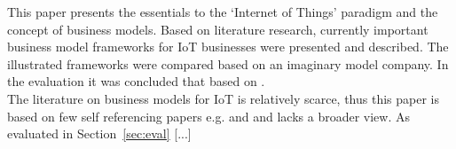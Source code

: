 	This paper presents the essentials to the `Internet of Things' paradigm and the concept of business models. Based on literature research, currently important business model frameworks for IoT businesses were presented and described. The illustrated frameworks were compared based on an imaginary model company. In the evaluation it was concluded that \todo{[...]} based on \todo{[...]}.\\
	The literature on business models for IoT is relatively scarce, thus this paper is based on few self referencing papers e.g. \cite{ju} and \cite{dijkman} and lacks a broader view. As evaluated in Section~\ref{sec:eval} [...]\\

